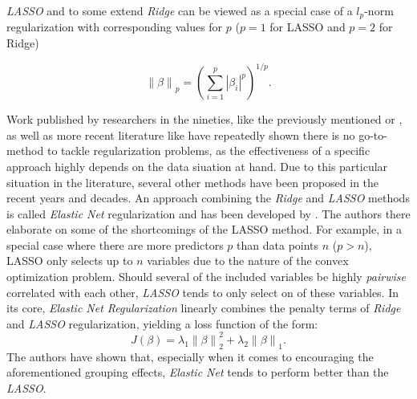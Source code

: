 \documentclass[12pt,a4paper]{article}
\newcommand{\norm}[1]{\left\lVert#1\right\rVert}
\begin{document}
\textit{LASSO} and to some extend \textit{Ridge} can be viewed as a special case of a $l_p$-norm regularization with corresponding values for $p$ ($p = 1$ for LASSO and $p=2$ for Ridge) \parencite{FrankFriedman1993} 

$$\norm{\beta}_p =  \left(\sum_{i=1}^p|\beta_i|^p\right)^{1/p}.$$

Work published by researchers in the nineties, like the previously mentioned \textcite{FrankFriedman1993} or \textcite{Fu1998}, as well as more recent literature like \textcite{WangEtAl2020} have repeatedly shown there is no go-to-method to tackle regularization problems, as the effectiveness of a specific approach highly depends on the data siuation at hand. Due to this particular situation in the literature, several other methods have been proposed in the recent years and decades. An approach combining the \textit{Ridge} and \textit{LASSO} methods is called \textit{Elastic Net} regularization and has been developed by \textcite{ZouHastie2005}. The authors there elaborate on some of the shortcomings of the LASSO method. For example, in a special case where there are more predictors $p$ than data points $n$ ($p > n$), LASSO only selects up to $n$ variables due to the nature of the convex optimization problem. Should several of the included variables be highly \textit{pairwise} correlated with each other, \textit{LASSO} tends to only select on of these variables. In its core, \textit{Elastic Net Regularization} linearly combines the penalty terms of \textit{Ridge} and \textit{LASSO} regularization, yielding a loss function of the form:\\
$$J(\beta) = \lambda_1 \norm{\beta}_2^2 + \lambda_2 \norm{\beta}_1.$$
The authors have	 shown that, especially when it comes to encouraging the aforementioned grouping effects, \textit{Elastic Net} tends to perform better than the \textit{LASSO}.\\
\end{document}
